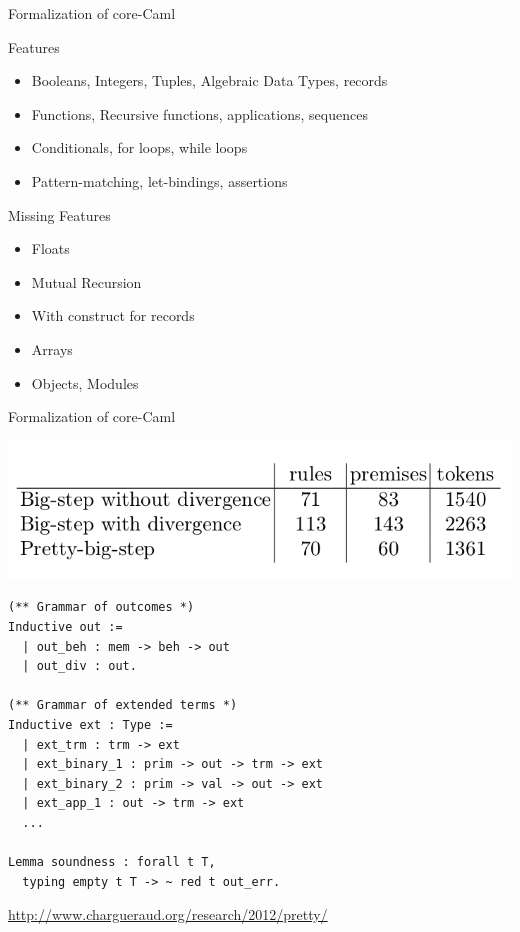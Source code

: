 \documentclass[page number,dvipsnames]{beamer}
\begin{document}
\begin{frame}{Formalization of core-Caml}
  \begin{exampleblock}{Features}
    \begin{itemize}
    \item Booleans, Integers, Tuples, Algebraic Data Types, records
    \item Functions, Recursive functions, applications, sequences
    \item Conditionals, for loops, while loops
    \item Pattern-matching, let-bindings, assertions
    \end{itemize}
  \end{exampleblock}
  \vfill
  \begin{alertblock}{Missing Features}
    \begin{itemize}
    \item Floats
    \item Mutual Recursion
    \item With construct for records
    \item Arrays
    \item Objects, Modules
    \end{itemize}
  \end{alertblock}

\end{frame}

\begin{frame}[fragile]{Formalization of core-Caml}
  \begin{center}
    \includegraphics[scale=0.3]{tokens.png}
  \end{center}
  \vfill
  \begin{lstlisting}
(** Grammar of outcomes *)
Inductive out :=
  | out_beh : mem -> beh -> out
  | out_div : out.

(** Grammar of extended terms *)
Inductive ext : Type :=
  | ext_trm : trm -> ext
  | ext_binary_1 : prim -> out -> trm -> ext
  | ext_binary_2 : prim -> val -> out -> ext
  | ext_app_1 : out -> trm -> ext
  ...

Lemma soundness : forall t T, 
  typing empty t T -> ~ red t out_err.
  \end{lstlisting}
  \vfill
  \url{http://www.chargueraud.org/research/2012/pretty/}
\end{frame}
\end{document}
